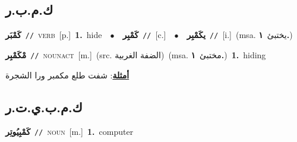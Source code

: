 \documentclass[10pt,a4paper,twoside]{article} %
\begin{document}
\begin{multicols}{2}
\vspace{-3mm}
\subsection*{\color{blue}\foreignlanguage{arabic}{ك.م.ب.ر}\color{blue}{}} 

{\setlength\topsep{0pt}\textbf{\foreignlanguage{arabic}{كَمْبَر}}\ {\color{gray}\texttt{//}\color{black}}\ \textsc{verb}\ [p.]\ \textbf{1.}~hide\ \ $\bullet$\ \ \setlength\topsep{0pt}\textbf{\foreignlanguage{arabic}{كَمْبِر}}\ {\color{gray}\texttt{//}\color{black}}\ [c.]\ \ $\bullet$\ \ \setlength\topsep{0pt}\textbf{\foreignlanguage{arabic}{يكَمْبِر}}\ {\color{gray}\texttt{//}\color{black}}\ [i.]\ \color{gray}(msa. \foreignlanguage{arabic}{يختبئ}~\foreignlanguage{arabic}{\textbf{١.}})\color{black}\ } \vspace{2mm}

{\setlength\topsep{0pt}\textbf{\foreignlanguage{arabic}{مْكَمْبِر}}\ {\color{gray}\texttt{//}\color{black}}\ \textsc{noun\textunderscore act}\ [m.]\ (src. \color{gray}\foreignlanguage{arabic}{الضفة الغربية}\color{black})\ \color{gray}(msa. \foreignlanguage{arabic}{مختبئ}~\foreignlanguage{arabic}{\textbf{١.}})\color{black}\ \textbf{1.}~hiding\  \begin{flushright}\color{gray}\foreignlanguage{arabic}{\textbf{\underline{\foreignlanguage{arabic}{أمثلة}}}: شفت طلع مكمبر ورا الشجرة}\end{flushright}\color{black}} \vspace{2mm}

\vspace{-3mm}
\subsection*{\color{blue}\foreignlanguage{arabic}{ك.م.ب.ي.ت.ر}\color{blue}{ (ntws)}} 

{\setlength\topsep{0pt}\textbf{\foreignlanguage{arabic}{كَمْبِيُوتِر}}\ {\color{gray}\texttt{//}\color{black}}\ \textsc{noun}\ [m.]\ \textbf{1.}~computer\ } \vspace{2mm}


\end{multicols}
\end{document}
